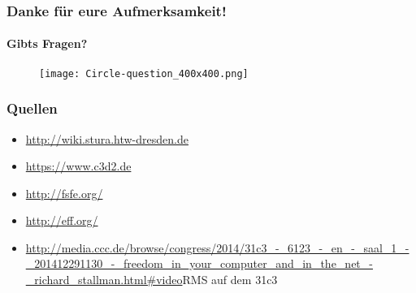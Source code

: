 \documentclass{beamer}              %
\begin{document}





\begin{frame}
  \frametitle{Danke für eure Aufmerksamkeit!}
  \framesubtitle{Gibts Fragen?}

  \begin{figure}
      \texttt{[image: Circle-question\_400x400.png]}
      \label{fig:Fragezeichenschild}
  \end{figure}

\end{frame}


\begin{frame}
  \frametitle{Quellen}
  \begin{itemize}
    \item \url{http://wiki.stura.htw-dresden.de}
    \item \url{https://www.c3d2.de}
    \item \url{http://fsfe.org/}
    \item \url{http://eff.org/}
    \item \url{http://media.ccc.de/browse/congress/2014/31c3_-_6123_-_en_-_saal_1_-_201412291130_-_freedom_in_your_computer_and_in_the_net_-_richard_stallman.html#video}{RMS auf dem 31c3}
    
  \end{itemize}  
\end{frame}

% 
% 
%
%


\end{document}
